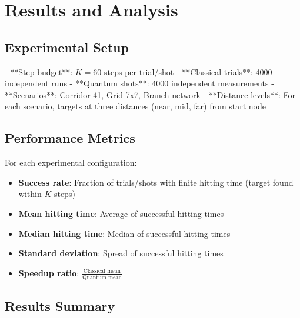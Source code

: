 \documentclass[12pt,a4paper]{article}
\begin{document}
\section{Results and Analysis}

\subsection{Experimental Setup}

- **Step budget**: $K = 60$ steps per trial/shot
- **Classical trials**: 4000 independent runs
- **Quantum shots**: 4000 independent measurements
- **Scenarios**: Corridor-41, Grid-7x7, Branch-network
- **Distance levels**: For each scenario, targets at three distances (near, mid, far) from start node

\subsection{Performance Metrics}

For each experimental configuration:
\begin{itemize}
    \item \textbf{Success rate}: Fraction of trials/shots with finite hitting time (target found within $K$ steps)
    \item \textbf{Mean hitting time}: Average of successful hitting times
    \item \textbf{Median hitting time}: Median of successful hitting times
    \item \textbf{Standard deviation}: Spread of successful hitting times
    \item \textbf{Speedup ratio}: $\frac{\text{Classical mean}}{\text{Quantum mean}}$
\end{itemize}

\subsection{Results Summary}
\end{document}
